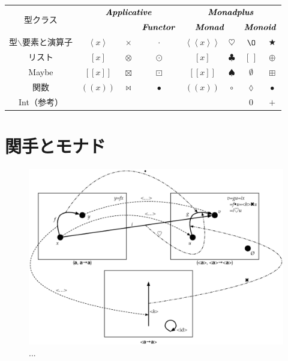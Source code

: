 \documentclass[a4paper]{jsbook}
\def\[{\left[\!\left[}
\def\]{\right]\!\right]}
\def\({\left(\!\left(}
\def\){\right)\!\right)}
\DeclareMathOperator{\mMapList}{\odot}
\newcommand{\mathTypeClass}[1]{\textbf{\emph{#1}}} %
\newcommand{\mathListWith}[1]{\left[#1\right]}
\newcommand{\mathMaybeWith}[1]{\[#1\]}
\newcommand{\mathPureWith}[1]{\left\langle#1\right\rangle}
\newcommand{\mathUnitWith}[1]{\left\langle\!\left\langle#1\right\rangle\!\right\rangle}
\newcommand{\mathId}{\O}
\newcommand{\mathEmptyList}{{[\,]}}
\newcommand{\mathNothing}{\emptyset}
\newcommand{\mathAnonymousParameter}{\lozenge}
\newcommand{\mathAnyBinaryOperator}{\mathbin{\bigstar}}
\newcommand{\mathAppend}{\oplus}
\newcommand{\mathApplicativeGeneralMap}{\mathbin{\times}}
\newcommand{\mathApplicativeMap}{\mathbin{\otimes}}
\newcommand{\mathApplicativeMaybeMap}{\mathbin{\boxtimes}}
\newcommand{\mathCompose}{\mathbin{\bullet}}
\newcommand{\mathGeneralMap}{\mathbin{\cdot}}
\newcommand{\mathMaybeMap}{\mathbin{\boxdot}}
\DeclareMathOperator{\hsklMaybeAppend}{{DO NOT USE}--\boxplus}
\DeclareMathOperator{\hsklMonadMap}{{DO NOT USE}--\heartsuit}
\begin{document}
\begin{table}
\begin{center}
\begin{tabular}{||c||c|c|c|c|c|c|c||}
\hline
\multirow{2}{*}{型クラス}
    &\multicolumn{3}{|c|}{$\mathTypeClass{Applicative}$}
    &\multicolumn{4}{|c||}{$\mathTypeClass{Monadplus}$}\\
\cline{4-8}
\multirow{1}{*}{}
    &\multicolumn{2}{|c|}{ }
    &$\mathTypeClass{Functor}$
    &\multicolumn{2}{|c}{$\mathTypeClass{Monad}$}
    &\multicolumn{2}{|c||}{$\mathTypeClass{Monoid}$}\\
\hline\hline
型$\backslash$要素と演算子
    &$\mathPureWith{x}$
    &$\mathApplicativeGeneralMap$
    &$\mathGeneralMap$
    &$\mathUnitWith{x}$
    &$\heartsuit$%
    &$\mathId$
    &$\mathAnyBinaryOperator$\\
\hline
リスト
    &$[x]$
    &$\mathApplicativeMap$
    &$\mMapList$
    &$\mathListWith{x}$
    &$\clubsuit$
    &$\mathEmptyList$
    &$\mathAppend$\\
\hline
Maybe
    &$\mathMaybeWith{x}$
    &$\mathApplicativeMaybeMap$
    &$\mathMaybeMap$
    &$\mathMaybeWith{x}$
    &$\spadesuit$
    &$\mathNothing$
    &$\boxplus$\\%
\hline
関数
    &$\(x\)$
    &$\bowtie$
    &$\mathCompose$
    &$\(x\)$
    &$\circ$
    &$\mathAnonymousParameter$
    &$\mathCompose$\\
\hline
Int（参考）
    &
    &
    &
    &
    &
    &$0$
    &$+$\\
\hline
\end{tabular}
\end{center}
\end{table}

\section{関手とモナド}

\begin{figure}
\begin{center}
\includegraphics[width=140mm]{fig/functor.eps}
\end{center}
\caption{...}
\label{fig:functor}
\end{figure}
\end{document}
